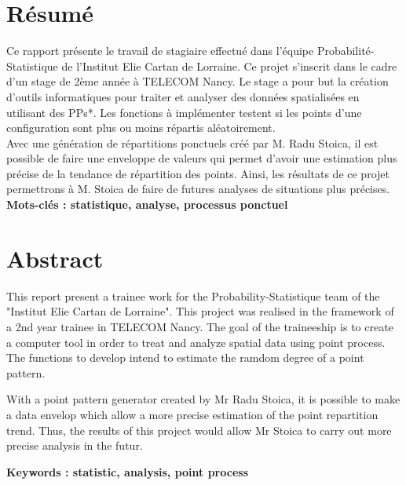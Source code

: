 \documentclass[stage2a]{tnreport}
\begin{document}
\cleardoublepage

\thispagestyle{empty}

\section*{Résumé}

Ce rapport présente le travail de stagiaire effectué dans l'équipe Probabilité-Statistique de l'Institut Elie Cartan de Lorraine. Ce projet s'inscrit dans le cadre d'un stage de 2ème année à TELECOM Nancy. Le stage a pour but la création d'outils informatiques pour traiter et analyser des données spatialisées en utilisant des \gls{PP}s*. Les fonctions à implémenter testent si les points d'une configuration sont plus ou moins répartis aléatoirement.\\

Avec une génération de répartitions ponctuels créé par M. Radu Stoica, il est possible de faire une enveloppe de valeurs qui permet d'avoir une estimation plus précise de la tendance de répartition des points. Ainsi, les résultats de ce projet permettrons à M. Stoica de faire de futures analyses de situations plus précises.\\

{\bf Mots-clés : statistique, analyse, processus ponctuel }


\section*{Abstract}

This report present a trainee work for the Probability-Statistique team of the "Institut Elie Cartan de Lorraine". This project was realised in the framework of a 2nd year trainee in TELECOM Nancy. The goal of the traineeship is to create a computer tool in order to treat and analyze spatial data using point process. The functions to develop intend to estimate the ramdom degree of a point pattern.

With a point pattern generator created by Mr Radu Stoica, it is possible to make a data envelop which allow a more precise estimation of the point repartition trend. Thus, the results of this project would allow Mr Stoica to carry out  more precise analysis in the futur.

{\bf Keywords : statistic, analysis, point process}
\end{document}
